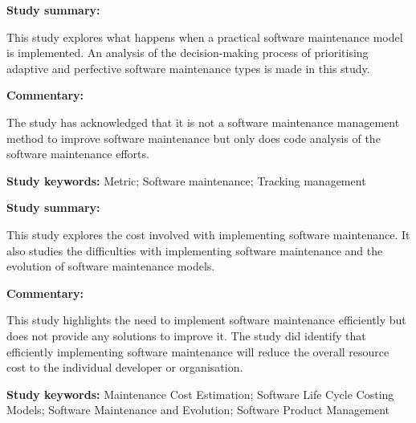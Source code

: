 \begin{tcolorbox}[colback=gray!5!white, colframe=deepblue!80!black, title=Metric-based tracking management in software maintenance\cite{Tang2010}]
	\begin{minipage}[t]{0.25\textwidth}
		\textbf{Study summary:}
	\end{minipage}
	\hfill
	\begin{minipage}[t]{0.65\textwidth}
		This study explores what happens when a practical software maintenance model is implemented. An analysis of the decision-making process of prioritising adaptive and perfective software maintenance types is made in this study.
	\end{minipage}

	\vspace{0.75em} 

	\begin{minipage}[t]{0.25\textwidth}
		\textbf{Commentary:}
	\end{minipage}
	\hfill
	\begin{minipage}[t]{0.65\textwidth}
		The study has acknowledged that it is not a software maintenance management method to improve software maintenance but only does code analysis of the software maintenance efforts.
	\end{minipage}
	\tcblower
	\textbf{Study keywords:} Metric; Software maintenance; Tracking management
\end{tcolorbox}

\begin{tcolorbox}[colback=gray!5!white, colframe=deepblue!80!black, title=A cost model for software maintenance \& evolution\cite{Sneed2004}]
	\begin{minipage}[t]{0.25\textwidth}
		\textbf{Study summary:}
	\end{minipage}
	\hfill
	\begin{minipage}[t]{0.65\textwidth}
		This study explores the cost involved with implementing software maintenance. It also studies the difficulties with implementing software maintenance and the evolution of software maintenance models. 
	\end{minipage}

	\vspace{0.75em} 

	\begin{minipage}[t]{0.25\textwidth}
		\textbf{Commentary:}
	\end{minipage}
	\hfill
	\begin{minipage}[t]{0.65\textwidth}
		This study highlights the need to implement software maintenance efficiently but does not provide any solutions to improve it. The study did identify that efficiently implementing software maintenance will reduce the overall resource cost to the individual developer or organisation.
	\end{minipage}
	\tcblower
	\textbf{Study keywords:} Maintenance Cost Estimation; Software Life Cycle Costing Models; Software Maintenance and Evolution; Software Product Management
\end{tcolorbox}

